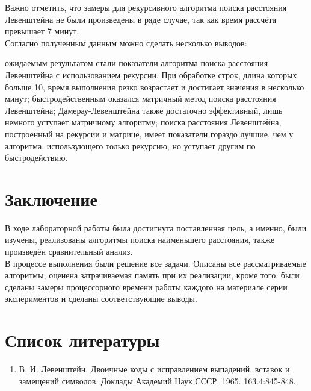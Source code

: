 \documentclass[12pt]{report}
\begin{document}
Важно отметить, что замеры для рекурсивного алгоритма поиска расстояния Левенштейна не были произведены в ряде случае, так как время рассчёта превышает 7 минут.\\

Согласно полученным данным можно сделать несколько выводов:
\begin{itemize}
	 ожидаемым результатом стали показатели алгоритма поиска расстояния Левенштейна с использованием рекурсии. При обработке строк, длина которых больше 10, время выполнения резко возрастает и достигает значения в несколько минут;
	 быстродейственным оказался матричный метод поиска расстояния Левенштейна;
	 Дамерау-Левенштейна также достаточно эффективный, лишь немного уступает матричному алгоритму;
	 поиска расстояния Левенштейна, построенный на рекурсии и матрице, имеет показатели гораздо лучшие, чем у алгоритма, использующего только рекурсию; но уступает другим по быстродействию.
\end{itemize}

\chapter*{Заключение}
В ходе лабораторной работы была достигнута поставленная цель, а именно, были изучены, реализованы алгоритмы поиска наименьшего расстояния, также произведён сравнительный анализ. \\

В процессе выполнения были решение все задачи. Описаны все рассматриваемые алгоритмы, оценена затрачиваемая память при их реализации, кроме того, были сделаны замеры процессорного времени работы каждого на материале серии экспериментов и сделаны соответствующие выводы.

\chapter*{Список литературы}

\begin{enumerate}
	\item В. И. Левенштейн. Двоичные коды с исправлением выпадений, вставок и замещений символов. Доклады Академий Наук СССР, 1965. 163.4:845-848.
\end{enumerate}
\end{document}
